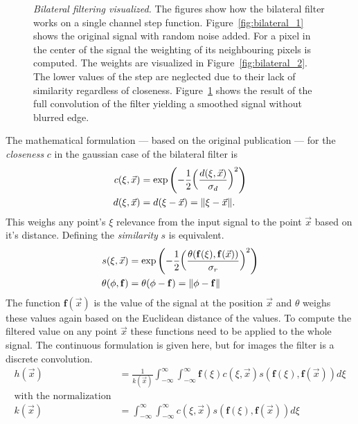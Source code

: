 \begin{figure}[H]
\begin{subfigure}[b]{0.3\linewidth}
        \caption{}\label{fig:bilateral_3}
    \end{subfigure}
    \caption[Bilateral filtering visualized]{\emph{Bilateral filtering visualized.} The figures show how the bilateral filter works on a single channel step function. Figure~\ref{fig:bilateral_1} shows the original signal with random noise added. For a pixel in the center of the signal the weighting of its neighbouring pixels is computed. The weights are visualized in Figure~\ref{fig:bilateral_2}. The lower values of the step are neglected due to their lack of similarity regardless of closeness. Figure~\ref{fig:bilateral_3} shows the result of the full convolution of the filter yielding a smoothed signal without blurred edge.}\label{fig:bilateral_filter}
\end{figure}
The mathematical formulation --- based on the original publication --- for the \emph{closeness} $c$ in the gaussian case of the bilateral filter is
\begin{equation}
\begin{aligned}
    c(\xi, \vec{x})&= \exp\left(-\frac{1}{2}{\left(\frac{d(\xi, \vec{x})}{\sigma_d} \right)}^2 \right) \\
    d(\xi, \vec{x})&= d(\xi - \vec{x}) = \lVert\xi - \vec{x}\rVert \text{.}
\end{aligned}
\end{equation}
This weighs any point's $\xi$ relevance from the input signal to the point $\vec{x}$ based on it's distance.
Defining the \emph{similarity} $s$ is equivalent.
\begin{equation}
\begin{aligned}
    s(\xi, \vec{x})&= \exp\left(-\frac{1}{2}{\left(\frac{\theta(\mathbf{f}(\xi), \mathbf{f}(\vec{x}))}{\sigma_r}\right)}^2\right) \\
    \theta(\phi, \mathbf{f})&= \theta(\phi - \mathbf{f}) = \lVert\phi - \mathbf{f}\rVert
\end{aligned}
\end{equation}
The function $\mathbf{f}(\vec{x})$ is the value of the signal at the position $\vec{x}$ and $\theta$ weighs these values again based on the Euclidean distance of the values.
To compute the filtered value on any point $\vec{x}$ these functions need to be applied to the whole signal.
The continuous formulation is given here, but for images the filter is a discrete convolution.
\begin{equation}
\begin{aligned}
    h(\vec{x}) &= \frac{1}{k(\vec{x})} \int_{-\infty}^{\infty} \int_{-\infty}^{\infty} \mathbf{f}(\xi) c(\xi, \vec{x}) s(\mathbf{f}(\xi), \mathbf{f}(\vec{x})) d\xi \\
    \text{with the normalization} \\
    k(\vec{x}) &= \int_{-\infty}^{\infty} \int_{-\infty}^{\infty} c(\xi, \vec{x}) s(\mathbf{f}(\xi), \mathbf{f}(\vec{x})) d\xi
\end{aligned}
\end{equation}
